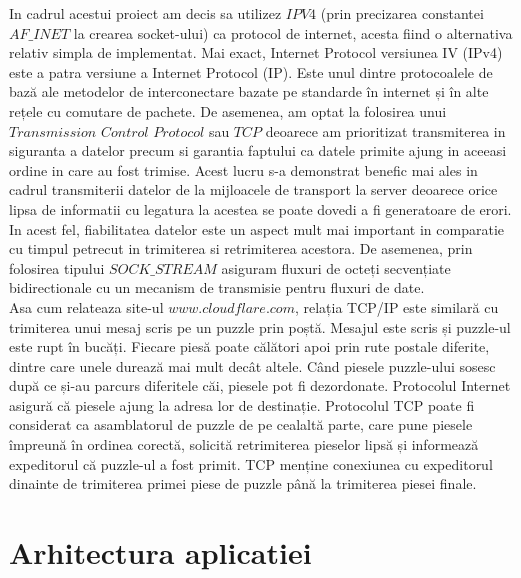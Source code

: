 \documentclass{llncs}
\begin{document}
\hspace{4mm} In cadrul acestui proiect am decis sa utilizez $IPV4$ (prin precizarea constantei $AF\_INET$ la crearea socket-ului) ca protocol de internet, acesta fiind o alternativa relativ simpla de implementat. Mai exact, Internet Protocol versiunea IV (IPv4) este a patra versiune a Internet Protocol (IP). Este unul dintre protocoalele de bază ale metodelor de interconectare bazate pe standarde în internet și în alte rețele cu comutare de pachete. De asemenea, am optat la folosirea unui $Transmission$ $Control$ $Protocol$ sau $TCP$ deoarece am prioritizat transmiterea in siguranta a datelor precum si garantia faptului ca datele primite ajung in aceeasi ordine in care au fost trimise. Acest lucru s-a demonstrat benefic mai ales in cadrul transmiterii datelor de la mijloacele de transport la server deoarece orice lipsa de informatii cu legatura la acestea se poate dovedi a fi generatoare de erori. In acest fel, fiabilitatea datelor este un aspect mult mai important in comparatie cu timpul petrecut in trimiterea si retrimiterea acestora. De asemenea, prin folosirea tipului $SOCK\_STREAM$ asiguram fluxuri de octeți secvențiate bidirectionale cu un mecanism de transmisie pentru fluxuri de date. \\
\hspace*{4mm} Asa cum relateaza site-ul $www.cloudflare.com$, relația TCP/IP este similară cu trimiterea unui mesaj scris pe un puzzle prin poștă. Mesajul este scris și puzzle-ul este rupt în bucăți. Fiecare piesă poate călători apoi prin rute postale diferite, dintre care unele durează mai mult decât altele. Când piesele puzzle-ului sosesc după ce și-au parcurs diferitele căi, piesele pot fi dezordonate. Protocolul Internet asigură că piesele ajung la adresa lor de destinație. Protocolul TCP poate fi considerat ca asamblatorul de puzzle de pe cealaltă parte, care pune piesele împreună în ordinea corectă, solicită retrimiterea pieselor lipsă și informează expeditorul că puzzle-ul a fost primit. TCP menține conexiunea cu expeditorul dinainte de trimiterea primei piese de puzzle până la trimiterea piesei finale.

\section{Arhitectura aplicatiei}

\end{document}
